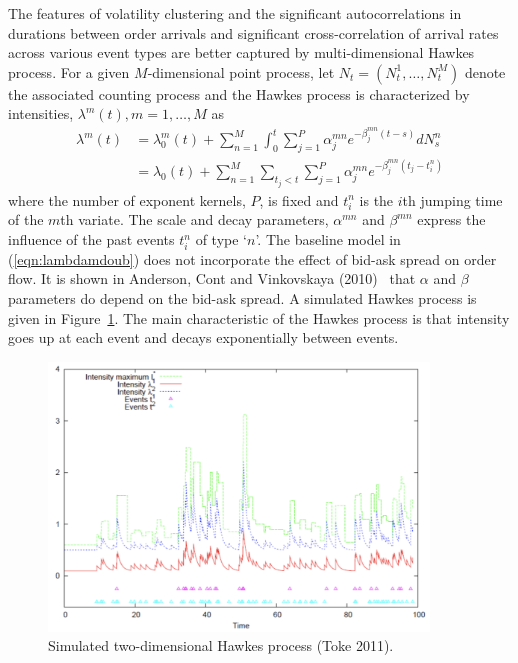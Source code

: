The features of volatility clustering and the significant autocorrelations in durations between order arrivals and significant cross-correlation of arrival rates across various event types are better captured by multi-dimensional Hawkes process. For a given $M$-dimensional point process, let $N_t=(N_t^1,\ldots,N_t^M)$ denote the associated counting process and the Hawkes process is characterized by intensities, $\lambda^m(t), m=1,\ldots,M$ as
	\begin{equation}\label{eqn:lambdamdoub}
	\begin{split}
	\lambda^m(t)&= \lambda_0^m(t) + \sum_{n=1}^M \int_0^t \sum_{j=1}^P \alpha_j^{mn} e^{-\beta_j^{mn}(t-s)} dN_s^n \\
	&=\lambda_0(t) + \sum_{n=1}^M \sum_{t_j<t} \sum_{j=1}^P \alpha_j^{mn} e^{-\beta_j^{mn}(t_j -t_i^n)}
	\end{split}
	\end{equation}
where the number of exponent kernels, $P$, is fixed and $t_i^n$ is the $i$th jumping time of the $m$th variate. The scale and decay parameters, $\alpha^{mn}$ and $\beta^{mn}$ express the influence of the past events $t_i^n$ of type `$n$'. The baseline model in (\ref{eqn:lambdamdoub}) does not incorporate the effect of bid-ask spread on order flow. It is shown in Anderson, Cont and Vinkovskaya (2010)~\cite{} that $\alpha$ and $\beta$ parameters do depend on the bid-ask spread. A simulated Hawkes process is given in Figure~\ref{fig:hawkes}. The main characteristic of the Hawkes process is that intensity goes up at each event and decays exponentially between events. 
	\begin{figure}[!ht]
   	\centering
   	\includegraphics[width=0.9\textwidth]{chapters/chapter_trade_data_models/figures/hawkes.png} 
   	\caption{Simulated two-dimensional Hawkes process (Toke 2011). \label{fig:hawkes}}
	\end{figure}

